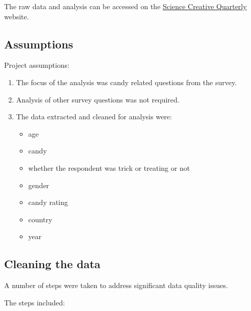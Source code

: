 \documentclass[]{article}
\providecommand{\tightlist}{%
  \setlength{\itemsep}{0pt}\setlength{\parskip}{0pt}}
\begin{document}
The raw data and analysis can be accessed on the
\href{https://www.scq.ubc.ca/so-much-candy-data-seriously/}{Science
Creative Quarterly} website.

\hypertarget{assumptions}{%
\subsection{Assumptions}\label{assumptions}}

Project assumptions:

\begin{enumerate}
\def\labelenumi{\arabic{enumi}.}
\item
  The focus of the analysis was candy related questions from the
  survey.\\
\item
  Analysis of other survey questions was not required.\\
\item
  The data extracted and cleaned for analysis were:

  \begin{itemize}
  \tightlist
  \item
    age\\
  \item
    candy\\
  \item
    whether the respondent was trick or treating or not\\
  \item
    gender\\
  \item
    candy rating\\
  \item
    country\\
  \item
    year
  \end{itemize}
\end{enumerate}

\hypertarget{cleaning-the-data}{%
\subsection{Cleaning the data}\label{cleaning-the-data}}

A number of steps were taken to address significant data quality issues.

The steps included:
\end{document}
